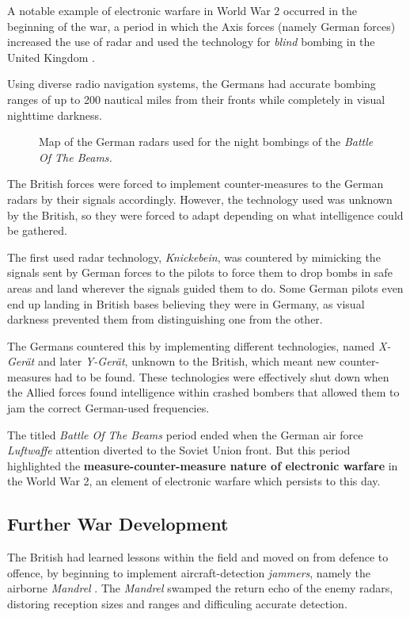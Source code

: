 \documentclass[palatino,english,purist]{ist-report}
\begin{document}
A notable example of electronic warfare in World War 2 occurred in the beginning of the war, a period in which the Axis forces (namely German forces) increased the use of radar and used the technology for \textit{blind} bombing in the United Kingdom \cite{wizardwar}.

Using diverse radio navigation systems, the Germans had accurate bombing ranges of up to 200 nautical miles from their fronts while completely in visual nighttime darkness.
\begin{figure}[ht]
    \centering
    \caption{Map of the German radars used for the night bombings of the \textit{Battle Of The Beams.}}
    \label{fig:botb_map}
\end{figure}

The British forces were forced to implement counter-measures to the German radars by \jamming{} their signals accordingly. However, the technology used was unknown by the British, so they were forced to adapt depending on what intelligence could be gathered.

The first used radar technology, \textit{Knickebein}, was countered by mimicking the signals sent by German forces to the pilots to force them to drop bombs in safe areas and land wherever the signals guided them to do. Some German pilots even end up landing in British bases believing they were in Germany, as visual darkness prevented them from distinguishing one from the other.

The Germans countered this by implementing different technologies, named \textit{X-Gerät} and later \textit{Y-Gerät}, unknown to the British, which meant new counter-measures had to be found. These technologies were effectively shut down when the Allied forces found intelligence within crashed bombers that allowed them to jam the correct German-used frequencies.

The titled \textit{Battle Of The Beams} period ended when the German air force \textit{Luftwaffe} attention diverted to the Soviet Union front. But this period highlighted the \textbf{measure-counter-measure nature of electronic warfare} in the World War 2, an element of electronic warfare which persists to this day.

\subsection{Further War Development}

The British had learned lessons within the field and moved on from defence to offence, by beginning to implement aircraft-detection \textit{jammers}, namely the airborne \textit{Mandrel} \cite{alican2006}. The \textit{Mandrel} swamped the return echo of the enemy radars, distoring reception sizes and ranges and difficuling accurate detection.
\end{document}
